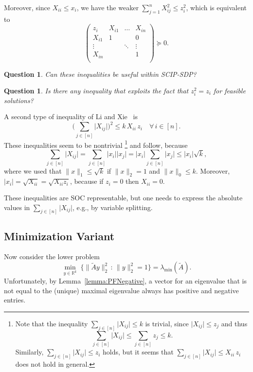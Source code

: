 \documentclass[10pt, a4paper]{article}
\newcommand{\suchthat}{\,:\,}
\newcommand{\abs}[1]{\lvert{#1}\rvert}
\newcommand{\norm}[1]{\lVert{#1}\rVert}
\newcommand{\Norm}[2]{\lVert{#1}\rVert_{#2}}
\newcommand{\R}{\mathds{R}}
\newtheorem{question}[theorem]{Question}
\begin{document}
Moreover, since $X_{ii} \leq x_i$, we have the weaker
$\sum_{j=1}^n X_{ij}^2 \leq z_i^2$, which is equivalent to
\[
  \begin{pmatrix}
    z_i & X_{i1} & \dots & X_{in} \\
    X_{i1} & 1 &  & 0 \\
    \vdots & & \ddots & \vdots \\
    X_{in} & &    & 1 \\
  \end{pmatrix}
  \succeq 0.
\]

\begin{question}
  Can these inequalities be useful within SCIP-SDP?
\end{question}

\begin{question}
  Is there any inequality that exploits the fact that $z_i^2 = z_i$ for
  feasible solutions?
\end{question}

A second type of inequality of Li and Xie~\cite{LiX20} is
\[
  \bigg(\sum_{j \in [n]} \abs{X_{ij}}\bigg)^2 \leq k\, X_{ii}\, z_i\quad
  \forall\, i \in [n].
\]
These inequalities seem to be nontrivial
\footnote{Note that the inequality $\sum_{j \in [n]} \abs{X_{ij}} \leq k$ is trivial,
since $\abs{X_{ij}} \leq z_j$ and thus
\[
  \sum_{j \in [n]} \abs{X_{ij}} \leq \sum_{j \in [n]} z_j \leq k.
\]
Similarly, $\sum_{j \in [n]} \abs{X_{ij}} \leq z_i$ holds, but it seems
that $\sum_{j \in [n]} \abs{X_{ij}} \leq X_{ii}\, z_i$ does not hold in general.}
and follow, because
\[
  \sum_{j \in [n]} \abs{X_{ij}} = \sum_{j \in [n]} \abs{x_i} \abs{x_j} =
  \abs{x_i} \sum_{j \in [n]} \abs{x_j} \leq \abs{x_i} \sqrt{k},
\]
where we used that $\norm{x}_1 \leq \sqrt{k}$ if $\norm{x}_2 = 1$ and
$\norm{x}_0 \leq k$. Moreover, $\abs{x_i} = \sqrt{X_{ii}} = \sqrt{X_{ii}
  z_i}$, because if $z_i = 0$ then $X_{ii} = 0$.

These inequalities are SOC representable, but one needs to express the
absolute values in $\sum_{j \in [n]} \abs{X_{ij}}$, e.g., by variable
splitting.


\subsection{Minimization Variant}

Now consider the lower problem
\[
  \min_{y \in \R^k} \; \{\Norm{\tilde{A}y}{2}^2 \suchthat \Norm{y}{2}^2 =
  1\} = \lambda_{\min}(\tilde{A}).
\]
Unfortunately, by Lemma~\ref{lemma:PFNegative}, a vector for an eigenvalue
that is not equal to the (unique) maximal eigenvalue always has positive
and negative entries.
\end{document}
